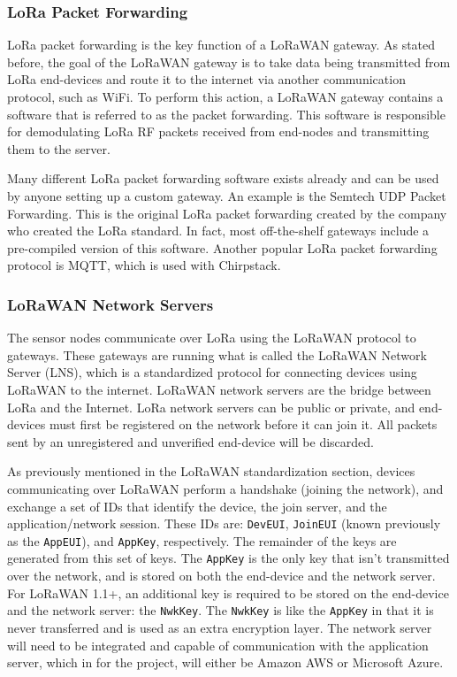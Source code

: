 \subsubsection{LoRa Packet Forwarding}
LoRa packet forwarding is the key function of a LoRaWAN gateway. As stated before, the goal of  the
LoRaWAN gateway is to take data being transmitted from LoRa end-devices and route it to the internet
via another communication protocol, such as WiFi. To perform this action, a LoRaWAN gateway contains
a software that is referred to as the packet forwarding. This software is responsible for
demodulating LoRa RF packets received from end-nodes and transmitting them to the server. 

Many different LoRa packet forwarding software exists already and can be used by anyone setting up
a custom gateway. An example is the Semtech UDP Packet Forwarding. This is the original LoRa packet
forwarding created by the company who created the LoRa standard. In fact, most off-the-shelf
gateways include a pre-compiled version of this software. Another popular LoRa packet forwarding
protocol is MQTT, which is used with Chirpstack.

\subsubsection{LoRaWAN Network Servers} The sensor nodes communicate over LoRa
using the LoRaWAN protocol to gateways.  These gateways are running what is called the LoRaWAN
Network Server (LNS), which is a standardized protocol for connecting devices using LoRaWAN to the
internet.  LoRaWAN network servers are the bridge between LoRa and the Internet.  LoRa network
servers can be public or private, and end-devices must first be registered on the network before it
can join it. All packets sent by an unregistered and unverified end-device will be discarded.

As previously mentioned in the LoRaWAN standardization section, devices communicating over LoRaWAN
perform a handshake (joining the network), and exchange a set of IDs that identify the device, the
join server, and the application/network session. These IDs are: \texttt{DevEUI}, \texttt{JoinEUI}
(known previously as the \texttt{AppEUI}), and \texttt{AppKey}, respectively. The remainder of the
keys are generated from this set of keys. The \texttt{AppKey} is the only key that isn't transmitted
over the network, and is stored on both the end-device and the network server. For LoRaWAN 1.1+, an
additional key is required to be stored on the end-device and the network server: the
\texttt{NwkKey}. The \texttt{NwkKey} is like the \texttt{AppKey} in that it is never transferred and
is used as an extra encryption layer. The network server will need to be integrated and capable of
communication with the application server, which in for the project, will either be Amazon AWS or
Microsoft Azure.

